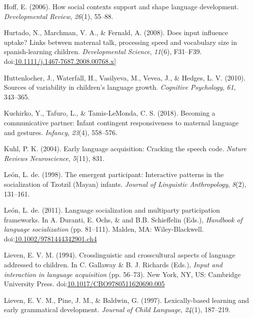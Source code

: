 \documentclass[floatsintext,man]{apa6}
\theoremstyle{definition}
\theoremstyle{definition}
\theoremstyle{definition}
\theoremstyle{remark}
\begin{document}
\hypertarget{ref-hoff2006social}{}
Hoff, E. (2006). How social contexts support and shape language
development. \emph{Developmental Review}, \emph{26}(1), 55--88.

\hypertarget{ref-hurtado2008does}{}
Hurtado, N., Marchman, V. A., \& Fernald, A. (2008). Does input
influence uptake? Links between maternal talk, processing speed and
vocabulary size in spanish-learning children. \emph{Developmental
Science}, \emph{11}(6), F31--F39.
doi:\href{https://doi.org/10.1111/j.1467-7687.2008.00768.x\%5D}{10.1111/j.1467-7687.2008.00768.x{]}}

\hypertarget{ref-huttenlocher2010sources}{}
Huttenlocher, J., Waterfall, H., Vasilyeva, M., Vevea, J., \& Hedges, L.
V. (2010). Sources of variability in children's language growth.
\emph{Cognitive Psychology}, \emph{61}, 343--365.

\hypertarget{ref-kuchirko2017becoming}{}
Kuchirko, Y., Tafuro, L., \& Tamis-LeMonda, C. S. (2018). Becoming a
communicative partner: Infant contingent responsiveness to maternal
language and gestures. \emph{Infancy}, \emph{23}(4), 558--576.

\hypertarget{ref-kuhl2004early}{}
Kuhl, P. K. (2004). Early language acquisition: Cracking the speech
code. \emph{Nature Reviews Neuroscience}, \emph{5}(11), 831.

\hypertarget{ref-deleon1998emergent}{}
León, L. de. (1998). The emergent participant: Interactive patterns in
the socialization of Tzotzil (Mayan) infants. \emph{Journal of
Linguistic Anthropology}, \emph{8}(2), 131--161.

\hypertarget{ref-deleon2011language}{}
León, L. de. (2011). Language socialization and multiparty participation
frameworks. In A. Duranti, E. Ochs, \& and B.B. Schieffelin (Eds.),
\emph{Handbook of language socialization} (pp. 81--111). Malden, MA:
Wiley-Blackwell.
doi:\href{https://doi.org/10.1002/9781444342901.ch4}{10.1002/9781444342901.ch4}

\hypertarget{ref-lieven1994crosslinguistic}{}
Lieven, E. V. M. (1994). Crosslinguistic and crosscultural aspects of
language addressed to children. In C. Gallaway \& B. J. Richards (Eds.),
\emph{Input and interaction in language acquisition} (pp. 56--73). New
York, NY, US: Cambridge University Press.
doi:\href{https://doi.org/10.1017/CBO9780511620690.005}{10.1017/CBO9780511620690.005}

\hypertarget{ref-lieven1997lexically}{}
Lieven, E. V. M., Pine, J. M., \& Baldwin, G. (1997). Lexically-based
learning and early grammatical development. \emph{Journal of Child
Language}, \emph{24}(1), 187--219.
\end{document}

